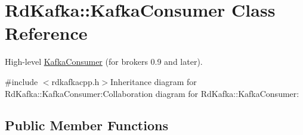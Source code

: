 \hypertarget{classRdKafka_1_1KafkaConsumer}{
\section{RdKafka::KafkaConsumer Class Reference}
\label{classRdKafka_1_1KafkaConsumer}
}


High-\/level \hyperlink{classRdKafka_1_1KafkaConsumer}{KafkaConsumer} (for brokers 0.9 and later).  


{\ttfamily \#include $<$rdkafkacpp.h$>$}Inheritance diagram for RdKafka::KafkaConsumer:Collaboration diagram for RdKafka::KafkaConsumer:\subsection*{Public Member Functions}
